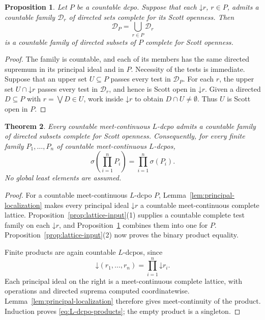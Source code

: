 \documentclass[10pt,a4paper]{amsart}
\newtheorem{theorem}{Theorem}[section]
\newtheorem{proposition}[theorem]{Proposition}
\numberwithin{equation}{section}
\newcommand{\down}[1]{\mathord{\downarrow}#1}
\newcommand{\Sc}{\sigma}
\begin{document}
\begin{proposition}\label{prop:local-tests}
Let $P$ be a countable dcpo. Suppose that each $\down r$, $r\in P$, admits a countable family $\mathcal D_r$ of directed sets complete for its Scott openness. Then
\begin{equation}\label{eq:local-test-union}
 \mathcal D_P=\bigcup_{r\in P}\mathcal D_r
\end{equation}
is a countable family of directed subsets of $P$ complete for Scott openness.
\end{proposition}
\begin{proof}
The family is countable, and each of its members has the same directed supremum in its principal ideal and in $P$. Necessity of the tests is immediate. Suppose that an upper set $U\subseteq P$ passes every test in $\mathcal D_P$. For each $r$, the upper set $U\cap\down r$ passes every test in $\mathcal D_r$, and hence is Scott open in $\down r$. Given a directed $D\subseteq P$ with $r=\bigvee D\in U$, work inside $\down r$ to obtain $D\cap U\ne\emptyset$. Thus $U$ is Scott open in $P$.
\end{proof}

\begin{theorem}\label{thm:L-dcpo-products}
Every countable meet-continuous $L$-dcpo admits a countable family of directed subsets complete for Scott openness. Consequently, for every finite family $P_1,\ldots,P_n$ of countable meet-continuous $L$-dcpos,
\begin{equation}\label{eq:L-dcpo-products}
 \Sc\!\left(\prod_{i=1}^{n}P_i\right)
 =\prod_{i=1}^{n}\Sc(P_i).
\end{equation}
No global least elements are assumed.
\end{theorem}
\begin{proof}
For a countable meet-continuous $L$-dcpo $P$, Lemma~\ref{lem:principal-localization} makes every principal ideal $\down r$ a countable meet-continuous complete lattice. Proposition~\ref{prop:lattice-input}\textup{(1)} supplies a countable complete test family on each $\down r$, and Proposition~\ref{prop:local-tests} combines them into one for $P$. Proposition~\ref{prop:lattice-input}\textup{(2)} now proves the binary product equality.

Finite products are again countable $L$-dcpos, since
\[
 \down(r_1,\ldots,r_n)=\prod_{i=1}^{n}\down r_i.
\]
Each principal ideal on the right is a meet-continuous complete lattice, with operations and directed suprema computed coordinatewise. Lemma~\ref{lem:principal-localization} therefore gives meet-continuity of the product. Induction proves \eqref{eq:L-dcpo-products}; the empty product is a singleton.
\end{proof}
\end{document}

